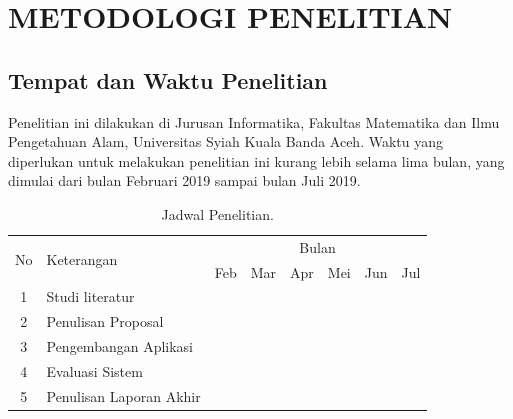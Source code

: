
\chapter{METODOLOGI PENELITIAN}

\section{Tempat dan Waktu Penelitian}
\setlength\parindent{30pt} Penelitian ini dilakukan di Jurusan Informatika, Fakultas Matematika dan Ilmu Pengetahuan Alam, Universitas Syiah Kuala Banda Aceh. Waktu yang diperlukan untuk melakukan penelitian ini kurang lebih selama lima bulan, yang dimulai dari bulan Februari 2019 sampai bulan Juli 2019.

\begin{table}[H]
	\center
	\caption{Jadwal Penelitian.}
	\label{jadwal}
	\begin{tabular}{|c|l|l|l|l|l|l|l|}
		\hline
		\multirow{2}{*}{No} & \multirow{2}{*}{Keterangan} 	& \multicolumn{6}{c|}{Bulan}           																										\\ \cline{3-8} 
							&                           	& Feb				& Mar  			& Apr			& Mei			& Jun			& Jul 					\\ \hline       
		1                   & Studi literatur           	&\cellcolor{gray}	&\cellcolor{gray}	&                   &                   &                   &                       	\\ \hline
		2                   & Penulisan Proposal           	&                   &\cellcolor{gray}	&\cellcolor{gray}	&                   &                   &                        	\\ \hline
		3                   & Pengembangan Aplikasi         &                   &                   & \cellcolor{gray}  & \cellcolor{gray} 	& \cellcolor{gray}  &                            \\ \hline
		4                   & Evaluasi Sistem               &                   &                   &           		&             		&\cellcolor{gray}	&  \cellcolor{gray}    \\ \hline
		5                   & Penulisan Laporan Akhir       &                   &                   &                   &        			&      				& \cellcolor{gray}     \\ \hline
	\end{tabular}
\end{table}

